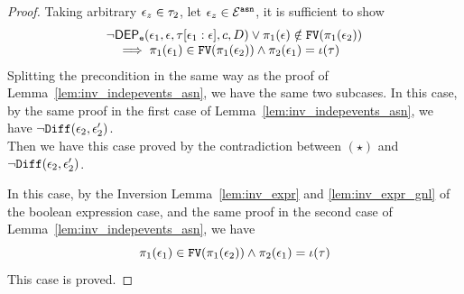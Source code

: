 \begin{proof}
%
Taking arbitrary $\mathtt{\epsilon}_z \in \mathtt{\tau}_2$, let $\mathtt{\epsilon}_z \in \mathcal{E}^{\mathtt{{asn}}}$, it is sufficient to show
\[
\begin{array}{l}
	\neg \mathsf{DEP_{\mathtt{e}}}(\mathtt{\epsilon}_1, \mathtt{\epsilon}, \mathtt{\tau}[\mathtt{\epsilon}_1:\mathtt{\epsilon}], c, D)
	\lor
	\pi_1(\mathtt{\epsilon}) \notin \mathtt{FV}(\pi_1(\mathtt{\epsilon}_2)) 
	\\ \quad 
	\implies 
	\pi_1(\mathtt{\epsilon}_1) \in \mathtt{FV}(\pi_1(\mathtt{\epsilon}_2)) \land {\pi_2(\ensuremath{\mathtt{\epsilon}}_1)} = \iota(\mathtt{\tau})
\end{array}
\]
Splitting the precondition in the same way as the proof of Lemma~\ref{lem:inv_indepevents_asn},
we have the same two subcases.
In this case, 
by the same proof in the first case of Lemma~\ref{lem:inv_indepevents_asn}, 
we have
$\neg \mathtt{Diff}(\mathtt{\epsilon}_2,\mathtt{\epsilon}_2')$.
\\
Then we have this case proved by the contradiction between $(\star)$ and $\neg \mathtt{Diff}(\mathtt{\epsilon}_2,\mathtt{\epsilon}_2')$.

In this case,
by the Inversion Lemma~\ref{lem:inv_expr} and \ref{lem:inv_expr_gnl} of the boolean expression case,
and the same proof in the second case of Lemma~\ref{lem:inv_indepevents_asn},
we have
\[ 
	\pi_1(\mathtt{\epsilon}_1) \in \mathtt{FV}(\pi_1(\mathtt{\epsilon}_2)) \land {\pi_2(\ensuremath{\mathtt{\epsilon}}_1)} = \iota(\mathtt{\tau})
	\]
This case is proved.
\end{proof}

